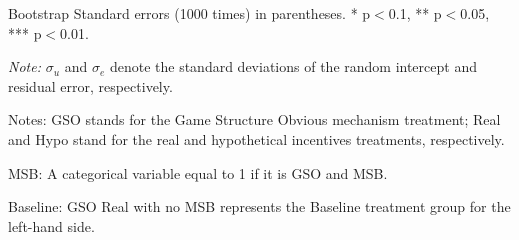 \documentclass[12pt]{article}
\begin{document}
\begin{table}[H]
\begin{tablenotes}
            \footnotesize
            \item Bootstrap Standard errors (1000 times) in parentheses. * p$<$0.1, ** p$<$0.05, *** p$<$0.01.
            \item \textit{Note:} $\sigma_u$ and $\sigma_e$ denote the standard deviations of the random intercept and residual error, respectively.
            \item Notes: GSO stands for the Game Structure Obvious mechanism treatment; Real and Hypo stand for the real and hypothetical incentives treatments, respectively.
            \item MSB: A categorical variable equal to 1 if it is GSO and MSB.
           \item Baseline: GSO Real with no MSB represents the Baseline treatment group for the left-hand side.
        \end{tablenotes}
\end{table}





\clearpage
\end{document}
